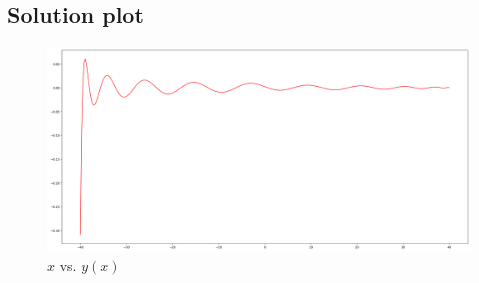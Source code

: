 \documentclass[12pt, a4paper]{article}
\begin{document}
\newpage
\begin{landscape}
\subsection{Solution plot}
\begin{figure}[hbtp]
	\centering
	\includegraphics[scale=0.38]{solution_unlabeled}
	\caption{$x$ vs. $y(x)$}
\end{figure}
\end{landscape}
\end{document}
